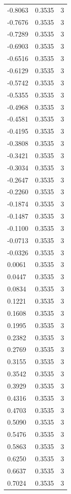 \begin{longtable}{lrr}
  -0.8063 & 0.3535 & 3 \\
  -0.7676 & 0.3535 & 3 \\
  -0.7289 & 0.3535 & 3 \\
  -0.6903 & 0.3535 & 3 \\
  -0.6516 & 0.3535 & 3 \\
  -0.6129 & 0.3535 & 3 \\
  -0.5742 & 0.3535 & 3 \\
  -0.5355 & 0.3535 & 3 \\
  -0.4968 & 0.3535 & 3 \\
  -0.4581 & 0.3535 & 3 \\
  -0.4195 & 0.3535 & 3 \\
  -0.3808 & 0.3535 & 3 \\
  -0.3421 & 0.3535 & 3 \\
  -0.3034 & 0.3535 & 3 \\
  -0.2647 & 0.3535 & 3 \\
  -0.2260 & 0.3535 & 3 \\
  -0.1874 & 0.3535 & 3 \\
  -0.1487 & 0.3535 & 3 \\
  -0.1100 & 0.3535 & 3 \\
  -0.0713 & 0.3535 & 3 \\
  -0.0326 & 0.3535 & 3 \\
  0.0061 & 0.3535 & 3 \\
  0.0447 & 0.3535 & 3 \\
  0.0834 & 0.3535 & 3 \\
  0.1221 & 0.3535 & 3 \\
  0.1608 & 0.3535 & 3 \\
  0.1995 & 0.3535 & 3 \\
  0.2382 & 0.3535 & 3 \\
  0.2769 & 0.3535 & 3 \\
  0.3155 & 0.3535 & 3 \\
  0.3542 & 0.3535 & 3 \\
  0.3929 & 0.3535 & 3 \\
  0.4316 & 0.3535 & 3 \\
  0.4703 & 0.3535 & 3 \\
  0.5090 & 0.3535 & 3 \\
  0.5476 & 0.3535 & 3 \\
  0.5863 & 0.3535 & 3 \\
  0.6250 & 0.3535 & 3 \\
  0.6637 & 0.3535 & 3 \\
  0.7024 & 0.3535 & 3 \\

\end{longtable}
